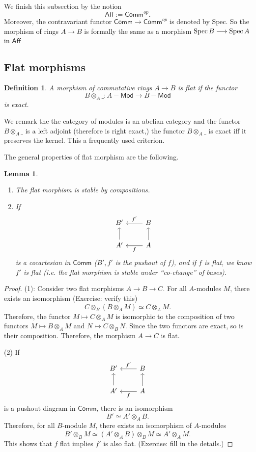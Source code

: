 \documentclass{tufte-book} %
\numberwithin{dummy}{section}
\newtheorem{lemma}[thm]{Lemma}
\newtheorem{dfn}[thm]{Definition}
\newcommand{\spec}{\textnormal{Spec}\,}
\newcommand{\lrta}{\longrightarrow}
\begin{document}
We finish this subsection by the notion
$$
\mathsf{Aff}:=\mathsf{Comm}^{op}.
$$
Moreover, the contravariant functor $\mathsf{Comm}\lrta \mathsf{Comm}^{op}$ is denoted by $\text{Spec}$. So the morphism of rings $A\lrta B$ is formally the same as a morphism $\spec B\lrta \spec A$ in $\mathsf{Aff}$

\subsection{Flat morphisms}
\begin{dfn}
A morphism of commutative rings $A\lrta B$ is flat if the functor 
$$
B\otimes_A\_: A-\mathsf{Mod}\lrta B-\mathsf{Mod}
$$
is exact.
\end{dfn}
We remark the  the category of modules is an abelian category and the functor $B\otimes_A\_$ is a left adjoint (therefore is right exact\sidenote{},) the functor $B\otimes_A\_$ is exact iff it preserves the kernel. This a frequently used criterion.

The general properties of flat morphism are the following.
\begin{lemma}\ 
\begin{enumerate}
\item The flat morphism is stable by compositions.
\item If 
$$
\begin{tikzcd}
B' & B \arrow[l, "f'"'] \\
A' \arrow[u] & A \arrow[l, "f"] \arrow[u]
\end{tikzcd}
$$
is a cocartesian in $\mathsf{Comm}$ ($B',f'$ is the pushout of $f$), and if $f$ is flat, we know $f'$ is flat (i.e. the flat morphism is stable under ``co-change'' of bases).
\end{enumerate}
\end{lemma}
\begin{proof}
(1): Consider two flat morphisms $A\lrta B\lrta C$. For all $A$-modules $M$, there exists an isomorphism (Exercise: verify this)
$$
C\otimes_B(B\otimes_A M)\simeq C\otimes_A M.
$$
Therefore, the functor $M\mapsto C\otimes_A M$ is isomorphic to the composition of two functors $M\mapsto B\otimes_A M$ and $N\mapsto C\otimes_B N$. Since the two functors are exact, so is their composition. Therefore, the morphism $A\lrta C$ is flat.

(2) If 
$$
\begin{tikzcd}
B' & B \arrow[l, "f'"'] \\
A' \arrow[u] & A \arrow[l, "f"] \arrow[u]
\end{tikzcd}
$$
is a pushout diagram in $\mathsf{Comm}$, there is an isomorphism 
$$
B'\simeq A'\otimes_A B.
$$
Therefore, for all $B$-module $M$, there exists an isomorphism of $A$-modules
$$
B'\otimes_B M\simeq (A'\otimes_A B)\otimes_B M\simeq A'\otimes_A M.
$$
This shows that $f$ flat implies $f'$ is also flat. (Exercise: fill in the details.)
\end{proof}
\end{document}
